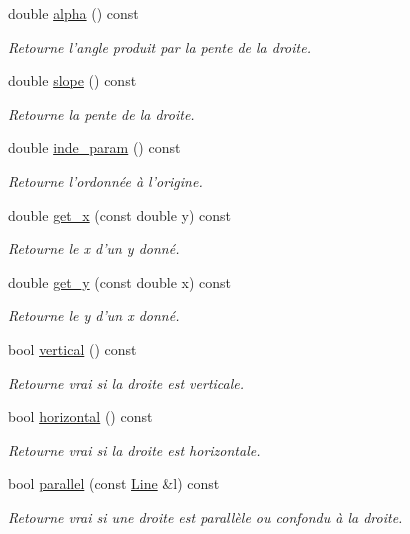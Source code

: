\begin{DoxyCompactItemize}
double \hyperlink{classLine_afe0a0abb45c0adccaedfaded8645600f}{alpha} () const 
\begin{DoxyCompactList}\small\item\em Retourne l'angle produit par la pente de la droite. \end{DoxyCompactList}\item 
double \hyperlink{classLine_a582597e85fc78ba06ccdddf6c270ed71}{slope} () const 
\begin{DoxyCompactList}\small\item\em Retourne la pente de la droite. \end{DoxyCompactList}\item 
double \hyperlink{classLine_a786bca726aa14177ebedbfeddc4bb8e5}{inde\+\_\+param} () const 
\begin{DoxyCompactList}\small\item\em Retourne l'ordonnée à l'origine. \end{DoxyCompactList}\item 
double \hyperlink{classLine_a53605544b400dda2164802a374f25b92}{get\+\_\+x} (const double y) const 
\begin{DoxyCompactList}\small\item\em Retourne le x d'un y donné. \end{DoxyCompactList}\item 
double \hyperlink{classLine_abe48fc1d77385ea5a80dc0a314127cff}{get\+\_\+y} (const double x) const 
\begin{DoxyCompactList}\small\item\em Retourne le y d'un x donné. \end{DoxyCompactList}\item 
bool \hyperlink{classLine_a8774606646298fb27a6e158af5e84590}{vertical} () const 
\begin{DoxyCompactList}\small\item\em Retourne vrai si la droite est verticale. \end{DoxyCompactList}\item 
bool \hyperlink{classLine_a1be7d198aeee493e6fba56f09057b4a6}{horizontal} () const 
\begin{DoxyCompactList}\small\item\em Retourne vrai si la droite est horizontale. \end{DoxyCompactList}\item 
bool \hyperlink{classLine_a3655584ad1c2958e4ab9c3ee9a3e6eed}{parallel} (const \hyperlink{classLine}{Line} \&l) const 
\begin{DoxyCompactList}\small\item\em Retourne vrai si une droite est parallèle ou confondu à la droite. \end{DoxyCompactList}\item 

\end{DoxyCompactItemize}
